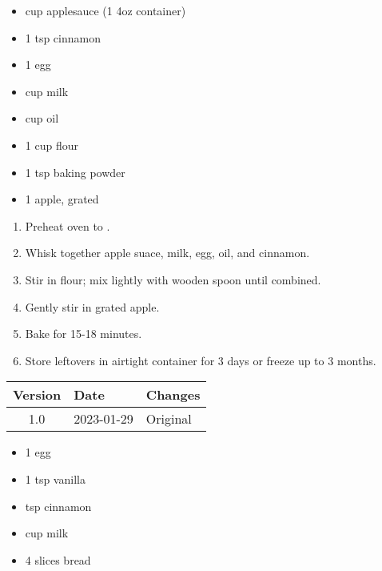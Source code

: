 
\ingredients
\begin{multicols}{2}
\raggedcolumns %
\begin{itemize}
    \item {} cup applesauce (1 4oz container)
    \item 1 tsp cinnamon
    \item 1 egg
    \item {} cup milk
    \item {} cup oil
    \item 1 cup flour
    \item 1 tsp baking powder
    \item 1 apple, grated
\end{itemize}
\end{multicols}

\instructions
\begin{enumerate}
    \item Preheat oven to .
    \item Whisk together apple suace, milk, egg, oil, and cinnamon.
    \item Stir in flour; mix lightly with wooden spoon until combined.
    \item Gently stir in grated apple.
    \item Bake for 15-18 minutes.
    \item Store leftovers in airtight container for 3 days or freeze up to 3 months.
\end{enumerate}

\vfill

\begin{tabular}{ c | l | l }
  \textbf{Version} & \textbf{Date} & \textbf{Changes} \\ 
  \hline		
  1.0 & 2023-01-29 & Original \\
\end{tabular}



\ingredients
\begin{multicols}{2}
\raggedcolumns %
\begin{itemize}
    \item 1 egg
    \item 1 tsp vanilla 
    \item {} tsp cinnamon
    \item {} cup milk
    \item 4 slices bread
\end{itemize}
\end{multicols}

